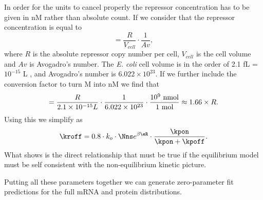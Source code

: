 In order for the units to cancel properly the repressor concentration has to be
given in nM rather than absolute count. If we consider that the repressor
concentration is equal to
\begin{equation}
[R] = \frac{R}{V_{cell}}\cdot \frac{1}{Av},
\end{equation}
where $R$ is the absolute repressor copy number per cell, $V_{cell}$ is the cell
volume and $Av$ is Avogadro's number. The \textit{E. coli} cell volume is in the
order of 2.1 fL = $10^{-15}$ L , and Avogadro's
number is $6.022 \times 10^{23}$. If we further include the conversion factor to
turn M into nM we find that
\begin{equation}
[R] = {R \over 2.1 \times 10^{-15} L} \cdot {1 \over 6.022 \times 10^{23}}
\cdot {10^9 \text{ nmol} \over 1 \text{ mol}} \approx 1.66 \times R.
\end{equation}
Using this we simplify  as
\begin{equation}
  \kroff = 0.8 \cdot k_o \cdot \Nns e^{\beta\eR}
   \cdot {\kpon \over \kpon + \kpoff}.
  \label{seq_kroff}
\end{equation}
What  shows is the direct relationship that must be true if the
equilibrium model must be self consistent with the non-equilibrium kinetic
picture.

Putting all these parameters together we can generate zero-parameter fit
predictions for the full mRNA and protein distributions.
